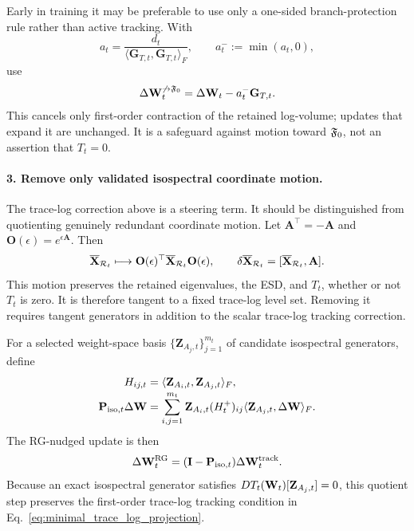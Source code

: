 Early in training it may be preferable to use only a one-sided branch-protection rule rather than active tracking.  With
\begin{equation}
  a_t=
  \frac{d_t}
       {\langle\mathbf G_{T,t},\mathbf G_{T,t}\rangle_F},
  \qquad
  a_t^-:=\min(a_t,0),
  \label{eq:one_sided_volume_coefficient}
\end{equation}
use
\begin{equation}
  \Delta\mathbf W_t^{\not\rightarrow\mathfrak F_0}
  =\Delta\mathbf W_t-a_t^-\mathbf G_{T,t}.
  \label{eq:one_sided_volume_projection}
\end{equation}
This cancels only first-order contraction of the retained log-volume; updates that expand it are unchanged.  It is a safeguard against motion toward $\mathfrak F_0$, not an assertion that $T_t=0$.

\paragraph{3. Remove only validated isospectral coordinate motion.}
The trace-log correction above is a steering term.  It should be distinguished from quotienting genuinely redundant coordinate motion.
Let $\mathbf A^{\top}=-\mathbf A$ and $\mathbf O(\epsilon)=e^{\epsilon\mathbf A}$.  Then
\begin{equation}
  \overline{\mathbf X}_{\mathcal R_t}
  \longmapsto
  \mathbf O(\epsilon)^{\top}
  \overline{\mathbf X}_{\mathcal R_t}
  \mathbf O(\epsilon),
  \qquad
  \delta\overline{\mathbf X}_{\mathcal R_t}
  =[\overline{\mathbf X}_{\mathcal R_t},\mathbf A].
  \label{eq:optimizer_isospectral_orbit}
\end{equation}
This motion preserves the retained eigenvalues, the ESD, and $T_t$, whether or not $T_t$ is zero.  It is therefore tangent to a fixed trace-log level set.  Removing it requires tangent generators in addition to the scalar trace-log tracking correction.

For a selected weight-space basis $\{\mathbf Z_{A_j,t}\}_{j=1}^{m_t}$ of candidate isospectral generators, define
\begin{align}
  H_{ij,t}
  &=\langle\mathbf Z_{A_i,t},\mathbf Z_{A_j,t}\rangle_F,
  \notag\\[-0.2em]
  \mathbf P_{{\rm iso},t}\Delta\mathbf W
  &=
  \sum_{i,j=1}^{m_t}
  \mathbf Z_{A_i,t}(H_t^+)_{ij}
  \langle\mathbf Z_{A_j,t},\Delta\mathbf W\rangle_F.
  \label{eq:optimizer_full_projector}
\end{align}
The RG-nudged update is then
\begin{equation}
  \Delta\mathbf W_t^{\rm RG}
  =
  (\mathbf I-\mathbf P_{{\rm iso},t})
  \Delta\mathbf W_t^{\rm track}.
  \label{eq:operational_projected_update}
\end{equation}
Because an exact isospectral generator satisfies
$DT_t(\mathbf W_t)[\mathbf Z_{A_j,t}]=0$, this quotient step preserves the first-order trace-log tracking condition in Eq.~\eqref{eq:minimal_trace_log_projection}.

